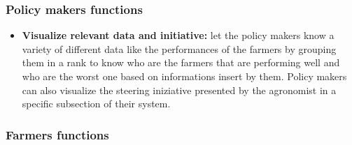 \documentclass[table, 12pt]{article}
\begin{document}
\subsubsection{Policy makers functions}
\begin{itemize}                                 
    \item \textbf{Visualize relevant data and initiative: }let the policy makers know a variety of different data like the performances of the farmers by grouping them in a rank to know who are the farmers that are performing well and who are the worst one based on informations insert by them.
    Policy makers can also visualize the steering iniziative presented by the agronomist in a specific subsection of their system.
\end{itemize}
\subsubsection{Farmers functions}
\end{document}
